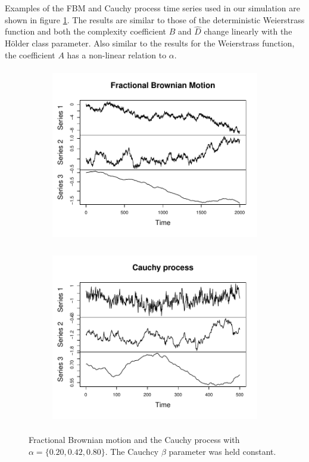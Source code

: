Examples of the FBM and Cauchy process time series used in our simulation are shown in figure \ref{fig:cauchyplot}. 
The results are similar to those of the deterministic 
Weierstrass function and both the complexity coefficient 
$B$ and $\hat D$ change linearly with the H\"older class
parameter. Also similar to the results for the Weierstrass 
function, the coefficient $A$ has a non-linear relation to $\alpha$.  
\begin{figure}[!htbp]
  \begin{subfigure}[b]{0.49\textwidth}
\includegraphics[width = 0.9\linewidth, height = 3in]{./figs/fBm-coeffs-plot.pdf}
  \end{subfigure}
  \hfill
  \begin{subfigure}[b]{0.49\textwidth}
  \includegraphics[width = 0.9\linewidth, height = 3in]{./figs/cauchy-plot.pdf}
    
  \end{subfigure}
  
  \caption{Fractional Brownian motion and the Cauchy process with $\alpha = \{ 0.20, 0.42, 0.80 \}$. The Cauchcy $\beta$ parameter was 
  held constant.}
  \label{fig:cauchyplot}
\end{figure}


